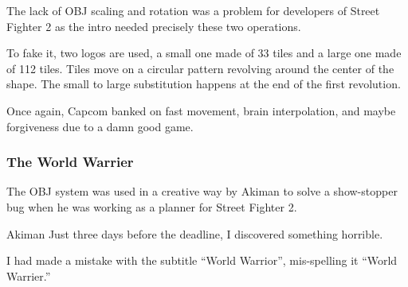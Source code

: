 \begin{minipage}[t]{0.32\linewidth}
\end{minipage}%
\hfill%
\begin{minipage}[t]{0.32\linewidth}
\end{minipage}
\hfill%
\begin{minipage}[t]{0.32\linewidth}
\end{minipage}

\begin{minipage}[t]{0.32\linewidth}
\end{minipage}%
\hfill%
\begin{minipage}[t]{0.32\linewidth}
\end{minipage}
\hfill%
\begin{minipage}[t]{0.32\linewidth}
\end{minipage}

The lack of OBJ scaling and rotation was a problem for developers of Street Fighter 2 as the intro needed precisely these two operations. 

To fake it, two logos are used, a small one made of 33 tiles and a large one made of 112 tiles. Tiles move on a circular pattern revolving around the center of the shape. The small to large substitution happens at the end of the first revolution.

Once again, Capcom banked on fast movement, brain interpolation, and maybe forgiveness due to a damn good game.












\subsubsection{The World Warrier}
The OBJ system was used in a creative way by Akiman to solve a show-stopper bug when he was working as a planner for Street Fighter 2.

\begin{q}{Akiman}
Just three days before the deadline, I discovered something horrible. 

I had made a mistake with the subtitle “World Warrior”, mis-spelling it “World Warrier.”
\end{q}

